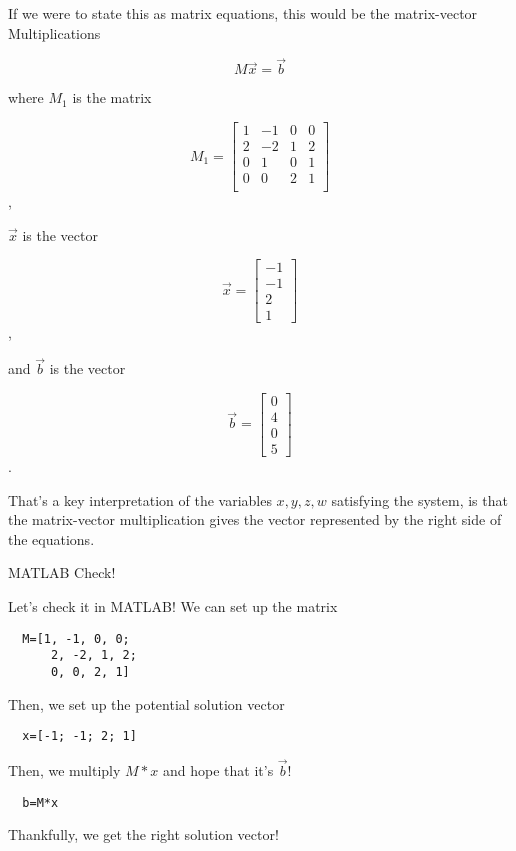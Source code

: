 \documentclass{ximera}
\begin{document}
If we were to state this as matrix equations, this would be the matrix-vector Multiplications

$$M\vec{x}=\vec{b}$$

where $M_1$ is the matrix 

\begin{equation}
  M_1=\begin{bmatrix}
    1 & -1 & 0 & 0 \\
    2 & -2 & 1 & 2 \\
    0 & 1  & 0 & 1 \\
    0 & 0  & 2 & 1 \\
  \end{bmatrix}
\end{equation},

$\vec{x}$ is the vector

\begin{equation}
  \vec{x}=\begin{bmatrix}
    -1 \\
    -1  \\
    2 \\
    1  
  \end{bmatrix}
\end{equation},

and $\vec{b}$ is the vector

\begin{equation}
  \vec{b}=\begin{bmatrix}
    0 \\
    4  \\
    0 \\
    5  
  \end{bmatrix}
\end{equation}.

That's a key interpretation of the variables $x, y, z, w$ satisfying the system, is that the matrix-vector multiplication gives the vector represented by the right side of the equations.

\begin{remark}{MATLAB Check!}

  Let's check it in MATLAB! We can set up the matrix 

  \begin{verbatim}
  M=[1, -1, 0, 0;
      2, -2, 1, 2;
      0, 0, 2, 1]
  \end{verbatim}

  Then, we set up the potential solution vector 

  \begin{verbatim}
  x=[-1; -1; 2; 1]
  \end{verbatim}

  Then, we multiply $M*x$ and hope that it's $\vec{b}$!

  \begin{verbatim}
  b=M*x
  \end{verbatim}

  Thankfully, we get the right solution vector!

\end{remark}
\end{document}
